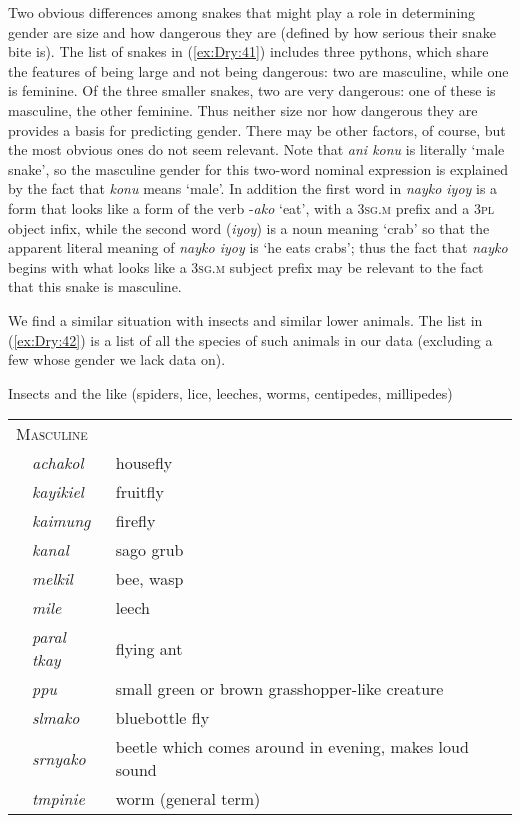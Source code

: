 \documentclass[output=collectionpaper]{langsci/langscibook}
\begin{document}
Two obvious differences among snakes that might play a role in determining gender are size and how dangerous they are (defined by how serious their snake bite is). The list of snakes in (\ref{ex:Dry:41}) includes three pythons, which share the features of being large and not being dangerous: two are masculine, while one is feminine. Of the three smaller snakes, two are very dangerous: one of these is masculine, the other feminine. Thus neither size nor how dangerous they are provides a basis for predicting gender. There may be other factors, of course, but the most obvious ones do not seem relevant. Note that \textit{ani konu} is literally `male snake', so the masculine gender for this two-word nominal expression is explained by the fact that \textit{konu} means `male'. In addition the first word in \textit{nayko iyoy} is a form that looks like a form of the verb -\textit{ako} `eat', with a \textsc{3sg.m} prefix and a \textsc{3pl} object infix, while the second word (\textit{iyoy}) is a noun meaning `crab' so that the apparent literal meaning of \textit{nayko iyoy} is `he eats crabs'; thus the fact that \textit{nayko} begins with what looks like a \textsc{3sg.m} subject prefix may be relevant to the fact that this snake is masculine.

We find a similar situation with insects and similar lower animals. The list in (\ref{ex:Dry:42}) is a list of all the species of such animals in our data (excluding a few whose gender we lack data on).

\ea    \label{ex:Dry:42}
Insects and the like (spiders, lice, leeches, worms, centipedes, millipedes)\\

\begin{tabularx}{0.9\textwidth}{lp{1.8cm}X}
\multicolumn{3}{l}{\textsc{Masculine}}\\
& \textit{achakol} & housefly\\
& \textit{kayikiel} & fruitfly\\
& \textit{kaimung} & firefly\\
& \textit{kanal} & sago grub\\
& \textit{melkil} & bee, wasp\\
& \textit{mile} & leech\\
& \textit{paral tkay} & flying ant\\
& \textit{ppu} & small green or brown grasshopper-like creature\\
& \textit{slmako} & bluebottle fly\\
& \textit{srnyako} & beetle which comes around in evening, makes loud sound\\
& \textit{tmpinie} & worm (general term)\\
\end{tabularx}
\end{document}
